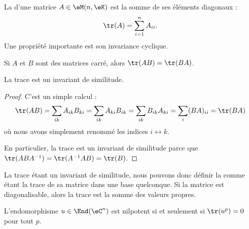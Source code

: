 La  d'une matrice \( A\in \eM(n,\eK)\) est la somme de ses éléments diagonaux :
\begin{equation}
    \tr(A)=\sum_{i=1}^nA_{ii}.
\end{equation}
Une propriété importante est son invariance cyclique.
\begin{lemma}   \label{LemhbZTay}
    Si \( A\) et \( B\) sont des matrices carré, alors \( \tr(AB)=\tr(BA)\).

    La trace est un invariant de similitude.
\end{lemma}

\begin{proof}
    C'est un simple calcul :
    \begin{equation}
            \tr(AB)=\sum_{ik}A_{ik}B_{ki}
            =\sum_{ik}A_{ki}B_{ik} 
            =\sum_{ik}B_{ik}A_{ki}
            =\sum_i(BA)_{ii}
            =\tr(BA)
    \end{equation}
    où nous avons simplement renommé les indices \( i\leftrightarrow k\).

    En particulier, la trace est un invariant de similitude parce que \( \tr(ABA^{-1})=\tr(A^{-1} AB)=\tr(B)\). 
\end{proof}
La trace étant un invariant de similitude, nous pouvons donc définir la  comme étant la trace de sa matrice dans une base quelconque. Si la matrice est diagonalisable, alors la trace est la somme des valeurs propres.

\begin{lemma}   \label{LemzgNOjY}
    L'endomorphisme \( u\in\End(\eC^n)\) est nilpotent si et seulement si \( \tr(u^p)=0\) pour tout \( p\).
\end{lemma}

